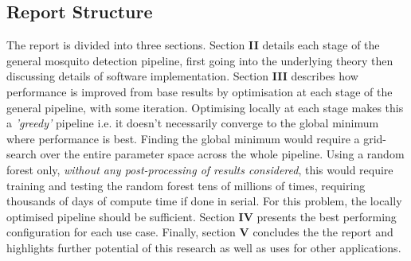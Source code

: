     \subsection{Report Structure}
    \label{subsec:bg-intro-structure}
        The report is divided into three sections. Section \textbf{II} details each stage of the general mosquito detection pipeline, first going into the underlying theory then discussing details of software implementation. Section \textbf{III} describes how performance is improved from base results by optimisation at each stage of the general pipeline, with some iteration. Optimising locally at each stage makes this a \textit{'greedy'} pipeline i.e. it doesn't necessarily converge to the global minimum where performance is best. Finding the global minimum would require a grid-search over the entire parameter space across the whole pipeline. Using a random forest only, \textit{without any post-processing of results considered}, this would require training and testing the random forest tens of millions of times, requiring thousands of days of compute time if done in serial. 
        For this problem, the locally optimised pipeline should be sufficient. Section \textbf{IV} presents the best performing configuration for each use case. Finally, section \textbf{V} concludes the the report and highlights further potential of this research as well as uses for other applications. 
